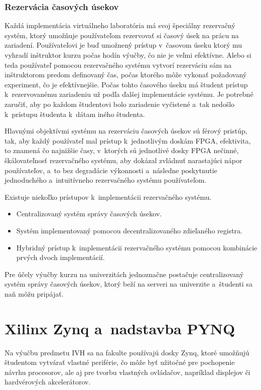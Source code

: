 \subsection{Rezervácia časových úsekov}

Každá implementácia virtuálneho laboratória má svoj špeciálny rezervačný systém, ktorý umožňuje používateľom rezervovať si časový úsek na prácu na zariadení. Používateľovi je buď umožnený prístup v~časovom úseku ktorý mu vyhradí inštruktor kurzu počas hodín výučby, čo nie je veľmi efektívne. Alebo si teda používateľ pomocou rezervačného systému vytvorí rezerváciu sám na inštruktorom predom definovaný čas, počas ktorého môže vykonať požadovaný experiment, čo je efektívnejšie. Počas tohto časového úseku má študent prístup k~rezervovanému zariadeniu už podľa ďalšej implementácie systému. Je potrebné zaručiť, aby po každom študentovi bolo zariadenie vyčistené a~tak nedošlo k~prístupu študenta k~dátam iného študenta.~\cite{monzo2021remote, mohsen2019remote}

Hlavnými objektívmi systému na rezerváciu časových úsekov sú férový pristúp, tak, aby každý používateľ mal prístup k~jednotlivým doskám FPGA, efektivita, to znamená čo najnižšie časy, v~ktorých sú jednotlivé dosky FPGA nečinné, škálovateľnosť rezervačného systému, aby dokázal zvládnuť narastajúci nápor používateľov, a~to bez degradácie výkonnosti a~následne poskytnutie jednoduchého a~intuitívneho rezervačného systému používateľom.~\cite{monzo2021remote}

Existuje niekoľko prístupov k~implementácii rezervačného systému. 
\begin{itemize}
    \item Centralizovaný systém správy časových úsekov.
    \item Systém implementovaný pomocou decentralizovaného zdieľaného registra.
    \item Hybridný prístup k~implementácii rezervačného systému pomocou kombinácie prvých dvoch implementácií. 
\end{itemize}

Pre účely výučby kurzu na univerzitách jednoznačne postačuje centralizovaný systém správy časových úsekov, ktorý beží na serveri na univerzite a~študenti sa naň môžu pripájať.~\cite{reichenbach2011new, mohsen2019remote}



\chapter{Xilinx Zynq a~nadstavba PYNQ}
\label{Zynq}
Na výučbu predmetu IVH sa na fakulte používajú dosky Zynq, ktoré umožňujú študentom vytvárať vlastné periférie, čo môže byť užitočné pre pochopenie návrhu procesorov, ale aj pre tvorbu vlastných ovládačov, napríklad displejov či hardvérových akcelerátorov.

